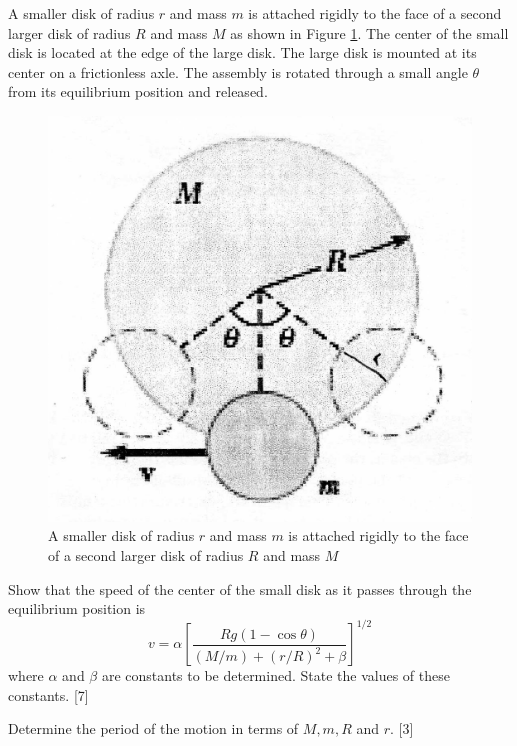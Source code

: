 \begin{problem}
    A smaller disk of radius $r$ and mass $m$ is attached rigidly to the face of a second larger disk of radius $R$ and mass $M$ as shown in Figure \ref{2010q6}. The center of the small disk is located at the edge of the large disk. The large disk is mounted at its center on a frictionless axle. The assembly is rotated through a small angle $\theta$ from its equilibrium position and released.
    \begin{figure}[h]
	   \centering
	   \includegraphics[width=0.5\linewidth]{spho_book_TYS_images/2010q6.png}
	   \caption{A smaller disk of radius $r$ and mass $m$ is attached rigidly to the face of a second larger disk of radius $R$ and mass $M$}\label{2010q6}
    \end{figure}
    \begin{subproblem}
        Show that the speed of the center of the small disk as it passes through the equilibrium position is
        \[v=\alpha\left[\frac{R g(1-\cos \theta)}{(M / m)+(r / R)^{2}+\beta}\right]^{1 / 2}\]
        where $\alpha$ and $\beta$ are constants to be determined. State the values of these constants.
    \hfill{[7]}\end{subproblem}
    
    \begin{subproblem}
        Determine the period of the motion in terms of $M, m, R$ and $r$.
    \hfill{[3]}\end{subproblem}
\end{problem}

